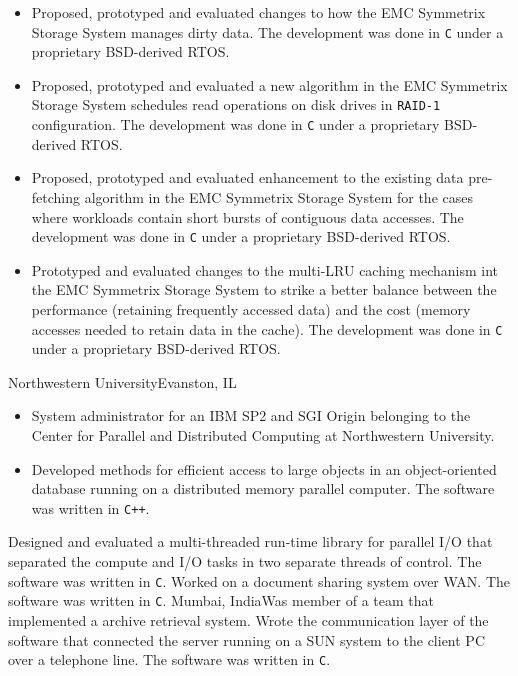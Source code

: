 {
	\begin{itemize}
		\item Proposed, prototyped and evaluated changes to how the EMC Symmetrix Storage System manages dirty data.
			The development was done in \texttt{C} under a proprietary BSD-derived RTOS.
		\item Proposed, prototyped and evaluated a new algorithm in the EMC Symmetrix Storage System schedules read
			operations on disk drives in \texttt{RAID-1} configuration.
			The development was done in \texttt{C} under a proprietary BSD-derived RTOS.
		\item Proposed, prototyped and evaluated enhancement to the existing data pre-fetching algorithm
			in the EMC Symmetrix Storage System for the cases where workloads contain short bursts of 
			contiguous data accesses. The development was done in \texttt{C} under a proprietary BSD-derived RTOS.
		\item Prototyped and evaluated changes to the multi-LRU caching mechanism int the EMC Symmetrix Storage
			System to strike a better balance between the performance (retaining frequently accessed data) and the cost
			(memory accesses needed to retain data in the cache).
			The development was done in \texttt{C} under a proprietary BSD-derived RTOS.
	\end{itemize}
}
{Northwestern University}{Evanston, IL}
{\begin{itemize}
	\item System administrator for an IBM SP2 and SGI Origin belonging to the 
		Center for Parallel and Distributed Computing at Northwestern University.
	\item Developed methods for efficient access to large objects in an object-oriented
		database running on a distributed memory parallel computer. The
		software was written in \texttt{C++}.
	\end{itemize}}
{Designed and evaluated a multi-threaded run-time library for parallel I/O that
separated the compute and I/O tasks in two separate threads of control. The
software was written in \texttt{C}.}
{Worked on a document sharing system over WAN. The software was written in \texttt{C}.}
{Mumbai, India}{}{Was member of a team that implemented a archive retrieval system.
Wrote the communication layer of the software that connected the server running
on a SUN system to the client PC over a telephone line. The software was
written in \texttt{C}.}

